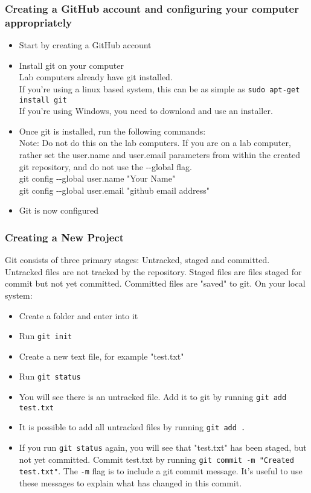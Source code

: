 \subsubsection{Creating a GitHub account and configuring your computer appropriately}
\begin{itemize}
    \item Start by creating a GitHub account
    \item Install git on your computer\\
    Lab computers already have git installed.\\
    If you're using a linux based system, this can be as simple as \verb|sudo apt-get install git|\\
    If you're using Windows, you need to download and use an installer.
    \item Once git is installed, run the following commands:\\
    Note: Do not do this on the lab computers. If you are on a lab computer, rather set the user.name and user.email parameters from within the created git repository, and do not use the \--\--global flag.\\
    git config \--\--global user.name "Your Name"\\
    git config \--\--global user.email "github email address"
    \item Git is now configured
\end{itemize}

\subsubsection{Creating a New Project}
Git consists of three primary stages: Untracked, staged and committed. Untracked files are not tracked by the repository. Staged files are files staged for commit but not yet committed. Committed files are "saved" to git.
On your local system:
\begin{itemize}
    \item Create a folder and enter into it
    \item Run \verb|git init|
    \item Create a new text file, for example "test.txt"
    \item Run \verb|git status|
    \item You will see there is an untracked file. Add it to git by running \verb|git add test.txt|
    \item It is possible to add all untracked files by running \verb|git add .|
    \item If you run \verb|git status| again, you will see that "test.txt" has been staged, but not yet committed. Commit test.txt by running \verb|git commit -m "Created test.txt"|. The \verb|-m| flag is to include a git commit message. It's useful to use these messages to explain what has changed in this commit.
\end{itemize}

